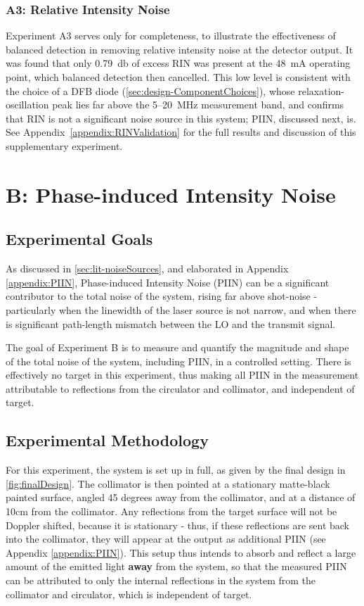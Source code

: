 \subsubsection{A3: Relative Intensity Noise}
Experiment A3 serves only for completeness, to illustrate the effectiveness of balanced detection in removing relative intensity noise at the detector output. It was found that only \SI{0.79}{\decibel} of excess RIN was present at the \SI{48}{\milli\ampere} operating point, which balanced detection then cancelled. This low level is consistent with the choice of a DFB diode (\autoref{sec:design-ComponentChoices}), whose relaxation-oscillation peak lies far above the 5--\SI{20}{\mega\hertz} measurement band, and confirms that RIN is not a significant noise source in this system; PIIN, discussed next, is. See Appendix~\ref{appendix:RINValidation} for the full results and discussion of this supplementary experiment.

\section{B: Phase-induced Intensity Noise}
\label{sec:PIINTesting}
\subsection{Experimental Goals}
As discussed in \autoref{sec:lit-noiseSources}, and elaborated in Appendix \ref{appendix:PIIN}, Phase-induced Intensity Noise (PIIN) can be a significant contributor to the total noise of the system, rising far above shot-noise - particularly when the linewidth of the laser source is not narrow, and when there is significant path-length mismatch between the LO and the transmit signal.

 The goal of Experiment B is to measure and quantify the magnitude and shape of the total noise of the system, including PIIN, in a controlled setting. There is effectively no target in this experiment, thus making all PIIN in the measurement attributable to reflections from the circulator and collimator, and independent of target. 
 
 
 \subsection{Experimental Methodology}
 For this experiment, the system is set up in full, as given by the final design in \autoref{fig:finalDesign}. The collimator is then pointed at a stationary matte-black painted surface, angled 45 degrees away from the collimator, and at a distance of 10cm from the collimator. Any reflections from the target surface will not be Doppler shifted, because it is stationary - thus, if these reflections are sent back into the collimator, they will appear at the output as additional PIIN (see Appendix \ref{appendix:PIIN}). This setup thus intends to absorb and reflect a large amount of the emitted light \textbf{away} from the system, so that the measured PIIN can be attributed to only the internal reflections in the system from the collimator and circulator, which is independent of target. 
 

